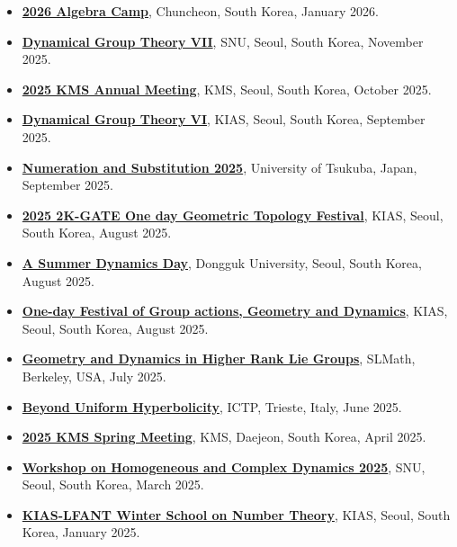 \documentclass[9pt]{developercv} %
\begin{document}
\vspace{-10 pt}
\begin{itemize}
\item \href{https://sites.google.com/snu.ac.kr/algebra-camp2026/home}{\textbf{2026 Algebra Camp}}, Chuncheon, South Korea, January 2026.
\item \href{https://sites.google.com/view/dgtvii}{\textbf{Dynamical Group Theory VII}}, SNU, Seoul, South Korea, November 2025.
\item \href{https://www.kms.or.kr/conference/meeting/index.html?period=90}{\textbf{2025 KMS Annual Meeting}}, KMS, Seoul, South Korea, October 2025.
\item \href{https://sites.google.com/view/dgt6}{\textbf{Dynamical Group Theory VI}}, KIAS, Seoul, South Korea, September 2025.
\item \href{https://numeration2025.sciencesconf.org}{\textbf{Numeration and Substitution 2025}}, University of Tsukuba, Japan, September 2025.
\item \href{https://sites.google.com/view/2025-one-day-gt-fest/home}{\textbf{2025 2K-GATE One day Geometric Topology Festival}}, KIAS, Seoul, South Korea, August 2025.
\item \href{https://sites.google.com/view/summerdday}{\textbf{A Summer Dynamics Day}}, Dongguk University, Seoul, South Korea, August 2025.
\item \href{https://sites.google.com/view/ggdfestival2025}{\textbf{One-day Festival of Group actions, Geometry and Dynamics}}, KIAS, Seoul, South Korea, August 2025.
\item \href{https://www.slmath.org/summer-schools/1104}{\textbf{Geometry and Dynamics in Higher Rank Lie Groups}}, SLMath, Berkeley, USA, July 2025.
\item \href{https://sites.google.com/view/beyonduniformhyperbolicity2025/home?authuser=0}{\textbf{Beyond Uniform Hyperbolicity}}, ICTP, Trieste, Italy, June 2025.
\item \href{https://www.kms.or.kr/conference/2025_spring/}{\textbf{2025 KMS Spring Meeting}}, KMS, Daejeon, South Korea, April 2025.
\item \href{https://www.math.snu.ac.kr/~lim/Workshop25.html}{\textbf{Workshop on Homogeneous and Complex Dynamics 2025}}, SNU, Seoul, South Korea, March 2025.
\item \href{http://events.kias.re.kr/h/KIASLFANT2025/?pageNo=5744}{\textbf{KIAS-LFANT Winter School on Number Theory}}, KIAS, Seoul, South Korea, January 2025.

\end{itemize}
\end{document}
